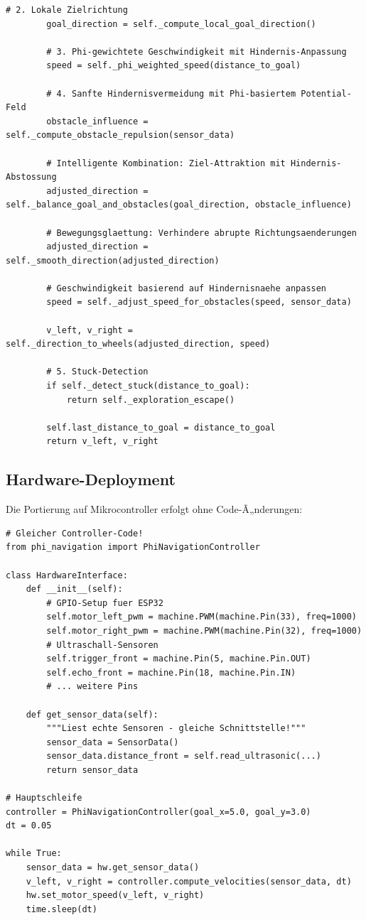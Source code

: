 ﻿\documentclass[a4paper,12pt]{article}
\theoremstyle{definition}
\begin{document}
\begin{lstlisting}[style=pythonstyle, caption={Methode \texttt{\_autonomous\_behavior}}, label={lst:ab}]
        # 2. Lokale Zielrichtung
        goal_direction = self._compute_local_goal_direction()
        
        # 3. Phi-gewichtete Geschwindigkeit mit Hindernis-Anpassung
        speed = self._phi_weighted_speed(distance_to_goal)
        
        # 4. Sanfte Hindernisvermeidung mit Phi-basiertem Potential-Feld
        obstacle_influence = self._compute_obstacle_repulsion(sensor_data)
        
        # Intelligente Kombination: Ziel-Attraktion mit Hindernis-Abstossung
        adjusted_direction = self._balance_goal_and_obstacles(goal_direction, obstacle_influence)
        
        # Bewegungsglaettung: Verhindere abrupte Richtungsaenderungen
        adjusted_direction = self._smooth_direction(adjusted_direction)
        
        # Geschwindigkeit basierend auf Hindernisnaehe anpassen
        speed = self._adjust_speed_for_obstacles(speed, sensor_data)
        
        v_left, v_right = self._direction_to_wheels(adjusted_direction, speed)
        
        # 5. Stuck-Detection
        if self._detect_stuck(distance_to_goal):
            return self._exploration_escape()
        
        self.last_distance_to_goal = distance_to_goal
        return v_left, v_right
\end{lstlisting}

\subsection{Hardware-Deployment}

Die Portierung auf Mikrocontroller erfolgt ohne Code-Ã„nderungen:

\begin{lstlisting}[style=pythonstyle, caption={ESP32 MicroPython Deployment}]
# Gleicher Controller-Code!
from phi_navigation import PhiNavigationController

class HardwareInterface:
    def __init__(self):
        # GPIO-Setup fuer ESP32
        self.motor_left_pwm = machine.PWM(machine.Pin(33), freq=1000)
        self.motor_right_pwm = machine.PWM(machine.Pin(32), freq=1000)
        # Ultraschall-Sensoren
        self.trigger_front = machine.Pin(5, machine.Pin.OUT)
        self.echo_front = machine.Pin(18, machine.Pin.IN)
        # ... weitere Pins
    
    def get_sensor_data(self):
        """Liest echte Sensoren - gleiche Schnittstelle!"""
        sensor_data = SensorData()
        sensor_data.distance_front = self.read_ultrasonic(...)
        return sensor_data

# Hauptschleife
controller = PhiNavigationController(goal_x=5.0, goal_y=3.0)
dt = 0.05

while True:
    sensor_data = hw.get_sensor_data()
    v_left, v_right = controller.compute_velocities(sensor_data, dt)
    hw.set_motor_speed(v_left, v_right)
    time.sleep(dt)
\end{lstlisting}
\end{document}
